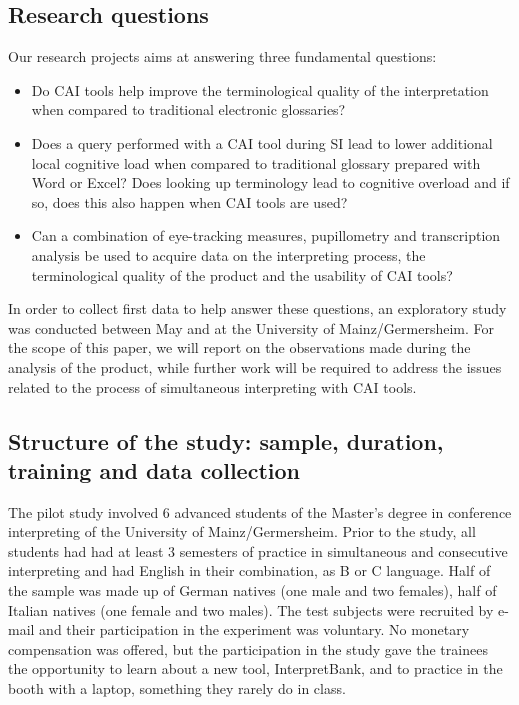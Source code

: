 \documentclass[output=paper]{langsci/langscibook}
\begin{document}
\subsection{Research questions}

Our research projects aims at answering three fundamental questions:

\begin{itemize}
\item Do CAI tools help improve the terminological quality of the interpretation when compared to traditional electronic glossaries?
\item Does a query performed with a CAI tool during SI lead to lower additional local cognitive load when compared to traditional glossary prepared with Word or Excel? Does looking up terminology lead to cognitive overload and if so, does this also happen when CAI tools are used?
\item Can a combination of eye-tracking measures, pupillometry and transcription analysis be used to acquire data on the interpreting process, the terminological quality of the product and the usability of CAI tools?
\end{itemize}

In order to collect first data to help answer these questions, an exploratory study was conducted between May and \citealt{July2017} at the University of Mainz/Germersheim. For the scope of this paper, we will report on the observations made during the analysis of the product, while further work will be required to address the issues related to the process of simultaneous interpreting with CAI tools.

\subsection{Structure of the study: sample, duration, training and data collection}

The pilot study involved 6 advanced students of the Master’s degree in conference interpreting of the University of Mainz/Germersheim. Prior to the study, all students had had at least 3 semesters of practice in simultaneous and consecutive interpreting and had English in their combination, as B or C language. Half of the sample was made up of German natives (one male and two females), half of Italian natives (one female and two males). The test subjects were recruited by e-mail and their participation in the experiment was voluntary. No monetary compensation was offered, but the participation in the study gave the trainees the opportunity to learn about a new tool, InterpretBank, and to practice in the booth with a laptop, something they rarely do in class.
\end{document}
